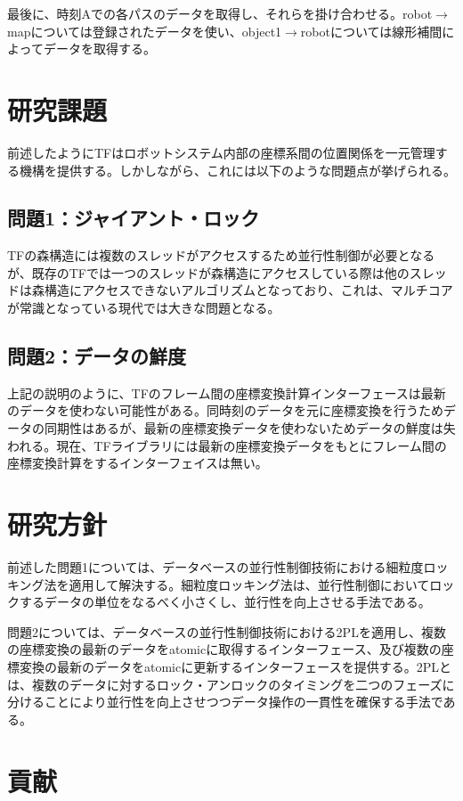 \documentclass[a4paper]{jreport}	%
\begin{document}
最後に、時刻Aでの各パスのデータを取得し、それらを掛け合わせる。robot$\rightarrow$mapについては登録されたデータを使い、object1$\rightarrow$robotについては線形補間によってデータを取得する。

\section{研究課題}
前述したようにTFはロボットシステム内部の座標系間の位置関係を一元管理する機構を提供する。しかしながら、これには以下のような問題点が挙げられる。

\subsection*{問題1：ジャイアント・ロック}
TFの森構造には複数のスレッドがアクセスするため並行性制御が必要となるが、既存のTFでは一つのスレッドが森構造にアクセスしている際は他のスレッドは森構造にアクセスできないアルゴリズムとなっており、これは、マルチコアが常識となっている現代では大きな問題となる。

\subsection*{問題2：データの鮮度}

上記の説明のように、TFのフレーム間の座標変換計算インターフェースは最新のデータを使わない可能性がある。同時刻のデータを元に座標変換を行うためデータの同期性はあるが、最新の座標変換データを使わないためデータの鮮度は失われる。現在、TFライブラリには最新の座標変換データをもとにフレーム間の座標変換計算をするインターフェイスは無い。

\section{研究方針}
前述した問題1については、データベースの並行性制御技術における細粒度ロッキング法を適用して解決する。細粒度ロッキング法は、並行性制御においてロックするデータの単位をなるべく小さくし、並行性を向上させる手法である。

問題2については、データベースの並行性制御技術における2PLを適用し、複数の座標変換の最新のデータをatomicに取得するインターフェース、及び複数の座標変換の最新のデータをatomicに更新するインターフェースを提供する。2PLとは、複数のデータに対するロック・アンロックのタイミングを二つのフェーズに分けることにより並行性を向上させつつデータ操作の一貫性を確保する手法である。

\section{貢献}
\end{document}
